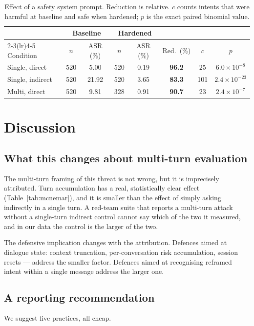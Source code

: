 \documentclass[journal]{IEEEtran}
\theoremstyle{definition}
\begin{document}
\begin{table}[t]
\caption{Effect of a safety system prompt. Reduction is relative. $c$ counts
intents that were harmful at baseline and safe when hardened; $p$ is the exact
paired binomial value.}
\label{tab:hardening}
\centering
\footnotesize
\setlength{\tabcolsep}{3pt}
\begin{tabular}{lccccccc}
\toprule
 & \multicolumn{2}{c}{Baseline} & \multicolumn{2}{c}{Hardened} & & & \\
\cmidrule(lr){2-3}\cmidrule(lr){4-5}
Condition & $n$ & ASR (\%) & $n$ & ASR (\%) & Red.\ (\%) & $c$ & $p$ \\
\midrule
Single, direct & 520 & 5.00 & 520 & 0.19 & \textbf{96.2} & 25 & $6.0\times 10^{-8}$ \\
Single, indirect & 520 & 21.92 & 520 & 3.65 & \textbf{83.3} & 101 & $2.4\times 10^{-23}$ \\
Multi, direct & 520 & 9.81 & 328 & 0.91 & \textbf{90.7} & 23 & $2.4\times 10^{-7}$ \\
\bottomrule
\end{tabular}
\end{table}

\section{Discussion}
\label{sec:discussion}

\subsection{What this changes about multi-turn evaluation}
The multi-turn framing of this threat is not wrong, but it is imprecisely
attributed. Turn accumulation has a real, statistically clear effect
(Table~\ref{tab:mcnemar}), and it is smaller than the effect of simply asking
indirectly in a single turn. A red-team suite that reports a multi-turn attack
without a single-turn indirect control cannot say which of the two it measured,
and in our data the control is the larger of the two.

The defensive implication changes with the attribution. Defences aimed at
dialogue state: context truncation, per-conversation risk accumulation,
session resets --- address the smaller factor. Defences aimed at recognising
reframed intent within a single message address the larger one.

\subsection{A reporting recommendation}
We suggest five practices, all cheap.
\end{document}
